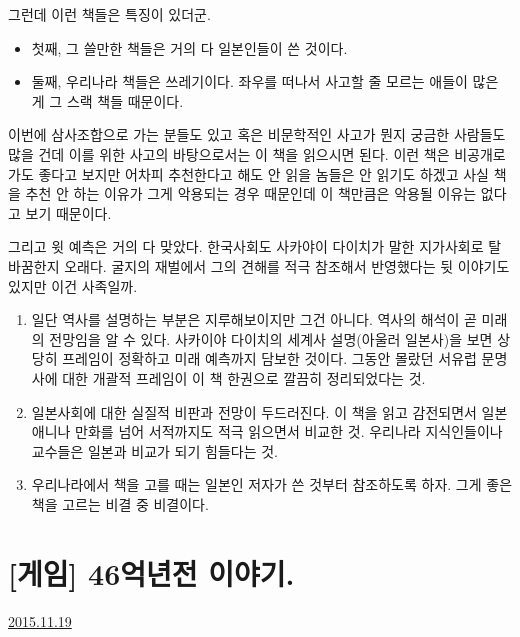 그런데 이런 책들은 특징이 있더군.
\begin{itemize}
    \item 첫째, 그 쓸만한 책들은 거의 다 일본인들이 쓴 것이다.
    \item 둘째, 우리나라 책들은 쓰레기이다. 좌우를 떠나서 사고할 줄 모르는 애들이 많은 게 그 스랙 책들 때문이다.
\end{itemize}
\vspace{5mm}

이번에 삼사조합으로 가는 분들도 있고 혹은 비문학적인 사고가 뭔지 궁금한 사람들도 많을 건데
이를 위한 사고의 바탕으로서는 이 책을 읽으시면 된다.
이런 책은 비공개로 가도 좋다고 보지만 어차피 추천한다고 해도 안 읽을 놈들은 안 읽기도 하겠고
사실 책을 추천 안 하는 이유가 그게 악용되는 경우 때문인데 이 책만큼은 악용될 이유는 없다고 보기 때문이다.
\vspace{5mm}

그리고 윗 예측은 거의 다 맞았다. 한국사회도 사카야이 다이치가 말한 지가사회로 탈바꿈한지 오래다.
굴지의 재벌에서 그의 견해를 적극 참조해서 반영했다는 뒷 이야기도 있지만 이건 사족일까.
\vspace{5mm}
\begin{enumerate}
    
    \item 일단 역사를 설명하는 부분은 지루해보이지만 그건 아니다. 역사의 해석이 곧 미래의 전망임을 알 수 있다.
    사카이야 다이치의 세계사 설명(아울러 일본사)을 보면 상당히 프레임이 정확하고 미래 예측까지 담보한 것이다.
    그동안 몰랐던 서유럽 문명사에 대한 개괄적 프레임이 이 책 한권으로 깔끔히 정리되었다는 것.
    \vspace{5mm}
    
    \item 일본사회에 대한 실질적 비판과 전망이 두드러진다.
    이 책을 읽고 감전되면서 일본 애니나 만화를 넘어 서적까지도 적극 읽으면서 비교한 것.
    우리나라 지식인들이나 교수들은 일본과 비교가 되기 힘들다는 것.
    \vspace{5mm}
    
    \item 우리나라에서 책을 고를 때는 일본인 저자가 쓴 것부터 참조하도록 하자.
    그게 좋은 책을 고르는 비결 중 비결이다.
\end{enumerate}
\vspace{5mm}







\section{[게임] 46억년전 이야기.}
\href{https://www.kockoc.com/Apoc/500223}{2015.11.19}


